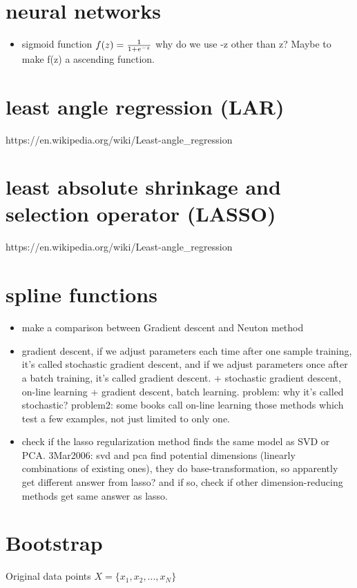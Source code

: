 \documentclass[10pt,a4paper]{book}
\begin{document}
\section {neural networks}
\begin{itemize}
\item sigmoid function  
$f(z) = {1 \over {1 + e^{-z}}}$  
why do we use -z other than z? Maybe to make f(z) a ascending function.
\end{itemize}

\section {least angle regression (LAR)}
https://en.wikipedia.org/wiki/Least-angle_regression

\section {least absolute shrinkage and selection operator (LASSO)}

https://en.wikipedia.org/wiki/Least-angle_regression

\section{spline functions}
\begin{itemize}


\item make a comparison between Gradient descent and Neuton method   
\item gradient descent, if we adjust parameters each time after one sample training, it's called stochastic gradient descent, and if we adjust parameters once after a batch training, it's called gradient descent.   
+ stochastic gradient descent, on-line learning   
+ gradient descent, batch learning.    
problem: why it's called stochastic?
problem2: some books call on-line learning those methods which test a few examples, not just limited to only one.   

\item check if the lasso regularization method finds the same model as SVD or PCA. 3Mar2006: svd and pca find potential dimensions (linearly combinations of existing ones), they do base-transformation, so apparently get different answer from lasso? and if so, check if other dimension-reducing methods get same answer as lasso.
\end{itemize}


\section{Bootstrap}
Original data points $X=\{x_1,x_2,...,x_N\}$
\end{document}

